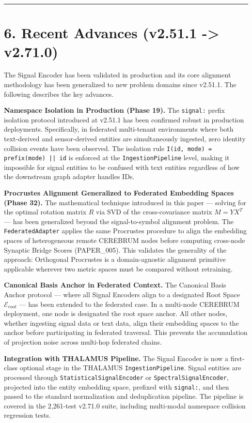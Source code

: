 \medskip\noindent\rule{\linewidth}{0.4pt}\medskip

\section*{6. Recent Advances (v2.51.1 -> v2.71.0)}

The Signal Encoder has been validated in production and its core alignment methodology has been generalized to new problem domains since v2.51.1. The following describes the key advances.

\textbf{Namespace Isolation in Production (Phase 19).} The \texttt{signal:} prefix isolation protocol introduced at v2.51.1 has been confirmed robust in production deployments. Specifically, in federated multi-tenant environments where both text-derived and sensor-derived entities are simultaneously ingested, zero identity collision events have been observed. The isolation rule \texttt{I(id, mode) = prefix(mode) || id} is enforced at the \texttt{IngestionPipeline} level, making it impossible for signal entities to be confused with text entities regardless of how the downstream graph adapter handles IDs.

\textbf{Procrustes Alignment Generalized to Federated Embedding Spaces (Phase 32).} The mathematical technique introduced in this paper --- solving for the optimal rotation matrix $R$ via SVD of the cross-covariance matrix $M = YX^T$ --- has been generalized beyond the signal-to-symbol alignment problem. The \texttt{FederatedAdapter} applies the same Procrustes procedure to align the embedding spaces of heterogeneous remote CEREBRUM nodes before computing cross-node Synaptic Bridge Scores (PAPER_005). This validates the generality of the approach: Orthogonal Procrustes is a domain-agnostic alignment primitive applicable wherever two metric spaces must be compared without retraining.

\textbf{Canonical Basis Anchor in Federated Context.} The Canonical Basis Anchor protocol --- where all Signal Encoders align to a designated Root Space $\mathcal{E}_{root}$ --- has been extended to the federated case. In a multi-node CEREBRUM deployment, one node is designated the root space anchor. All other nodes, whether ingesting signal data or text data, align their embedding spaces to the anchor before participating in federated traversal. This prevents the accumulation of projection noise across multi-hop federated chains.

\textbf{Integration with THALAMUS Pipeline.} The Signal Encoder is now a first-class optional stage in the THALAMUS \texttt{IngestionPipeline}. Signal entities are processed through \texttt{StatisticalSignalEncoder} or \texttt{SpectralSignalEncoder}, projected into the entity embedding space, prefixed with \texttt{signal:}, and then passed to the standard normalization and deduplication pipeline. The pipeline is covered in the 2,261-test v2.71.0 suite, including multi-modal namespace collision regression tests.